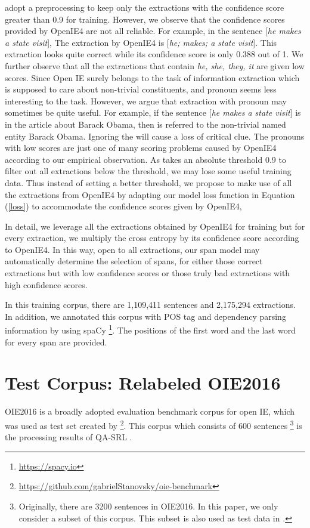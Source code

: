 \documentclass[letterpaper]{article} \usepackage{aaai20}  \usepackage{times}  \usepackage{helvet} \usepackage{courier}  \usepackage[hyphens]{url}  \urlstyle{rm} \def\UrlFont{\rm}  \usepackage{graphicx}  \frenchspacing  \setlength{\pdfpagewidth}{8.5in}  \setlength{\pdfpageheight}{11in}
\begin{document}
\cite{Cui2018NeuralOI} adopt a preprocessing to keep only the extractions with the confidence score greater than 0.9 for training. However, we observe that the confidence scores provided by OpenIE4 are not all reliable. For example, in the sentence [\emph{he makes a state visit}], The extraction by OpenIE4 is [\emph{he; makes; a state visit}]. This extraction looks quite correct while its confidence score is only 0.388 out of 1. We further observe that all the extractions that contain \emph{he, she, they, it} are given low scores. Since Open IE surely belongs to the task of information extraction which is supposed to care about non-trivial constituents, and pronoun seems less interesting to the task. However, we argue that extraction with pronoun may sometimes be quite useful. For example, if the sentence [\emph{he makes a state visit}] is in the article about Barack Obama, then  is referred to the non-trivial named entity Barack Obama. Ignoring the  will cause a loss of critical clue. The pronouns with low scores are just one of many scoring problems caused by OpenIE4 according to our empirical observation. As \cite{Cui2018NeuralOI} takes an absolute threshold 0.9 to filter out all extractions below the threshold, we may lose some useful training data. Thus instead of setting a better threshold, we propose to make use of all the extractions from OpenIE4 by adapting our model loss function in Equation (\ref{loss}) to accommodate the confidence scores  given by OpenIE4, 

In detail, we leverage all the extractions obtained by OpenIE4 for training but for every extraction, we multiply the cross entropy by its confidence score according to OpenIE4. In this way, open to all extractions, our span model may automatically determine the selection of spans, for either those correct extractions but with low confidence scores or those truly bad extractions with high confidence scores. 

In this training corpus, there are 1,109,411 sentences and 2,175,294 extractions. In addition, we annotated this corpus with POS tag and dependency parsing information by using spaCy \footnote{\url{https://spacy.io}}. The positions of the first word and the last word for every span are provided.

\section{Test Corpus: Relabeled OIE2016}
OIE2016 is a broadly adopted evaluation benchmark corpus for open IE, which was used as test set created by \cite{Stanovsky2016CreatingAL}\footnote{\url{https://github.com/gabrielStanovsky/oie-benchmark}}. This corpus which consists of 600 sentences \footnote{Originally, there are 3200 sentences in OIE2016. In this paper, we only consider a subset of this corpus. This subset is also used as test data in \cite{Stanovsky2018SupervisedOI}.} is the processing results of QA-SRL \cite{He2015QuestionAnswerDS}.
\end{document}
